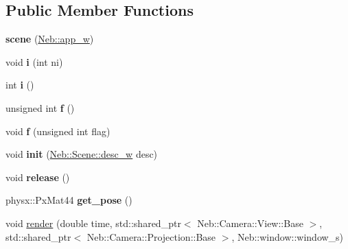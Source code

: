 \subsection*{\-Public \-Member \-Functions}
\begin{DoxyCompactItemize}
\item 
\hypertarget{classNeb_1_1Scene_1_1scene_ac355c846bf77b7cfd42d29bb0164ca45}{{\bfseries scene} (\hyperlink{classNeb_1_1weak__ptr}{\-Neb\-::app\-\_\-w})}\label{classNeb_1_1Scene_1_1scene_ac355c846bf77b7cfd42d29bb0164ca45}

\item 
\hypertarget{classNeb_1_1Scene_1_1scene_abe1fa6d1512bfd84e91f9192e7c743ca}{void {\bfseries i} (int ni)}\label{classNeb_1_1Scene_1_1scene_abe1fa6d1512bfd84e91f9192e7c743ca}

\item 
\hypertarget{classNeb_1_1Scene_1_1scene_abbc88704970f055844e5f06453178dcb}{int {\bfseries i} ()}\label{classNeb_1_1Scene_1_1scene_abbc88704970f055844e5f06453178dcb}

\item 
\hypertarget{classNeb_1_1Scene_1_1scene_acb8ef22577d6d70aef89faf02c671d77}{unsigned int {\bfseries f} ()}\label{classNeb_1_1Scene_1_1scene_acb8ef22577d6d70aef89faf02c671d77}

\item 
\hypertarget{classNeb_1_1Scene_1_1scene_a25b3ffec412aa55a88d4c4fb6a1c7a3b}{void {\bfseries f} (unsigned int flag)}\label{classNeb_1_1Scene_1_1scene_a25b3ffec412aa55a88d4c4fb6a1c7a3b}

\item 
\hypertarget{classNeb_1_1Scene_1_1scene_a9e908f1bd9d78e2f2d5c84746c96325f}{void {\bfseries init} (\hyperlink{classNeb_1_1weak__ptr}{\-Neb\-::\-Scene\-::desc\-\_\-w} desc)}\label{classNeb_1_1Scene_1_1scene_a9e908f1bd9d78e2f2d5c84746c96325f}

\item 
\hypertarget{classNeb_1_1Scene_1_1scene_a5de02f6d7763af6ad7b5fb8e57499a65}{void {\bfseries release} ()}\label{classNeb_1_1Scene_1_1scene_a5de02f6d7763af6ad7b5fb8e57499a65}

\item 
\hypertarget{classNeb_1_1Scene_1_1scene_ac14e8f1e177017420a5ef773a42f3b97}{physx\-::\-Px\-Mat44 {\bfseries get\-\_\-pose} ()}\label{classNeb_1_1Scene_1_1scene_ac14e8f1e177017420a5ef773a42f3b97}

\item 
\hypertarget{classNeb_1_1Scene_1_1scene_a93ec5f617a2af11309aec47102bb0b60}{void \hyperlink{classNeb_1_1Scene_1_1scene_a93ec5f617a2af11309aec47102bb0b60}{render} (double time, std\-::shared\-\_\-ptr$<$ \-Neb\-::\-Camera\-::\-View\-::\-Base $>$, std\-::shared\-\_\-ptr$<$ \-Neb\-::\-Camera\-::\-Projection\-::\-Base $>$, \-Neb\-::window\-::window\-\_\-s)}\label{classNeb_1_1Scene_1_1scene_a93ec5f617a2af11309aec47102bb0b60}


\end{DoxyCompactItemize}
